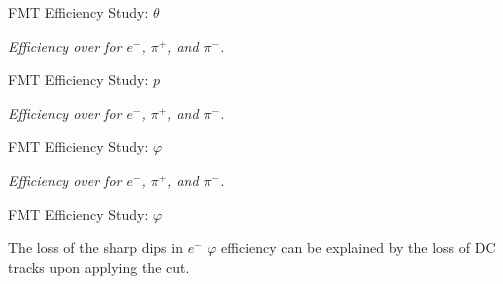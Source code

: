 \begin{frame}{FMT Efficiency Study: $\theta$}
    \begin{center}
        \vspace{-6pt}
        \begin{figure}[t]
        \end{figure}
        \scriptsize{\textit{Efficiency over \ef{$\theta$} for $e^-$, $\pi^+$, and $\pi^-$.}}
    \end{center}

\end{frame}

\begin{frame}{FMT Efficiency Study: $p$}
    \begin{center}
        \vspace{-6pt}
        \begin{figure}[t]
        \end{figure}
        \scriptsize{\textit{Efficiency over  for $e^-$, $\pi^+$, and $\pi^-$.}}
    \end{center}

\end{frame}

\begin{frame}{FMT Efficiency Study: $\varphi$}
    \begin{center}
        \vspace{-6pt}
        \begin{figure}[t]
        \end{figure}
        \scriptsize{\textit{Efficiency over \ef{$\varphi$} for $e^-$, $\pi^+$, and $\pi^-$.}}
    \end{center}

\end{frame}

\begin{frame}{FMT Efficiency Study: $\varphi$}
    \label{20.04::fmt_efficiency_study_end}

    The loss of the sharp dips in $e^-$ $\varphi$ efficiency can be explained by the loss of DC tracks upon applying the cut.

    \begin{center}
        \begin{figure}[t]
        \end{figure}
    \end{center}

\end{frame}
